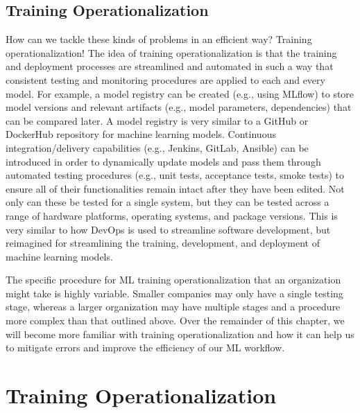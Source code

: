 {{{\subsection{Training Operationalization}
    How can we tackle these kinds of problems in an efficient way? Training operationalization! The idea of training operationalization is that the training and deployment processes are streamlined and automated in such a way that consistent testing and monitoring procedures are applied to each and every model. For example, a model registry can be created (e.g., using MLflow) to store model versions and relevant artifacts (e.g., model parameters, dependencies) that can be compared later. A model registry is very similar to a GitHub or DockerHub repository for machine learning models. Continuous integration/delivery capabilities (e.g., Jenkins, GitLab, Ansible) can be introduced in order to dynamically update models and pass them through automated testing procedures (e.g., unit tests, acceptance tests, smoke tests) to ensure all of their functionalities remain intact after they have been edited. Not only can these be tested for a single system, but they can be tested across a range of hardware platforms, operating systems, and package versions. This is very similar to how DevOps is used to streamline software development, but reimagined for streamlining the training, development, and deployment of machine learning models.
    
    The specific procedure for ML training operationalization that an organization might take is highly variable. Smaller companies may only have a single testing stage, whereas a larger organization may have multiple stages and a procedure more complex than that outlined above. Over the remainder of this chapter, we will become more familiar with training operationalization and how it can help us to mitigate errors and improve the efficiency of our ML workflow.

\section{Training Operationalization}

}}}
